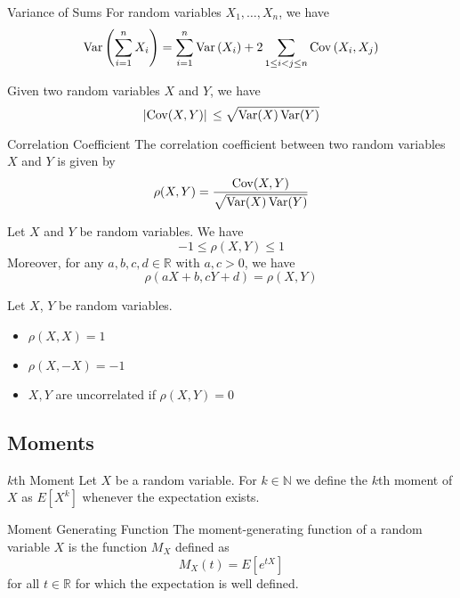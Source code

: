 \documentclass[a4paper]{article}
\begin{document}
\begin{prp}{Variance of Sums}{} For random variables $X_1,\dots,X_n$, we have $$\operatorname{Var}\left(\sum_{i=1}^{n}X_i\right)=\sum_{i=1}^n\operatorname{Var}\left(X_i\right)+2\sum_{1\leq i<j\leq n}\operatorname{Cov}\left(X_i,X_j\right)$$
\end{prp}

\begin{thm}{}{} Given two random variables $X$ and $Y$, we have $$\abs*{\operatorname{Cov}(X,Y)}\leq\sqrt{\operatorname{Var}(X)\operatorname{Var}(Y)}$$
\end{thm}

\begin{thm}{Correlation Coefficient}{} The correlation coefficient between two random variables $X$ and $Y$ is given by $$\rho(X,Y)=\frac{\operatorname{Cov}(X,Y)}{\sqrt{\operatorname{Var}(X)\operatorname{Var}(Y)}}$$
\end{thm}

\begin{prp}{}{} Let $X$ and $Y$ be random variables. We have $$-1\leq\rho(X,Y)\leq 1$$ Moreover, for any $a,b,c,d\in\mathbb{R}$ with $a,c>0$, we have $$\rho(aX+b,cY+d)=\rho(X,Y)$$
\end{prp}

\begin{prp}{}{} Let $X$, $Y$ be random variables. 
\begin{itemize}
\item $\rho(X,X)=1$
\item $\rho(X,-X)=-1$
\item $X,Y$ are uncorrelated if $\rho(X,Y)=0$
\end{itemize}
\end{prp}

\subsection{Moments}
\begin{defn}{$k$th Moment}{} Let $X$ be a random variable. For $k\in\mathbb{N}$ we define the $k$th  moment of $X$ as $E[X^k]$ whenever the expectation exists. 
\end{defn}

\begin{defn}{Moment Generating Function}{} The moment-generating function of a random variable $X$ is the function $M_X$ defined as $$M_X(t)=E[e^{tX}]$$ for all $t\in\mathbb{R}$ for which the expectation is well defined. 
\end{defn}
\end{document}
